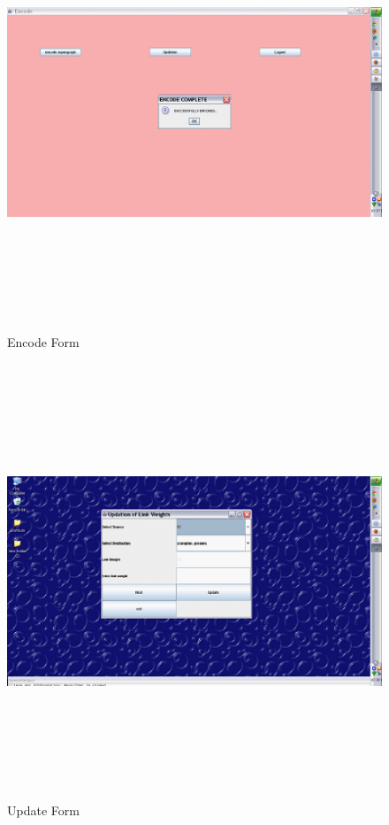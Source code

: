 \begin{center}
\begin{figure}[H]
\includegraphics[width=16cm,height=13cm]{encode.eps}
\caption{Encode Form}
\end{figure}

\begin{figure}[H]
\includegraphics[width=16cm,height=13cm]{update.eps}
\caption{Update Form}
\end{figure}


\end{center}
